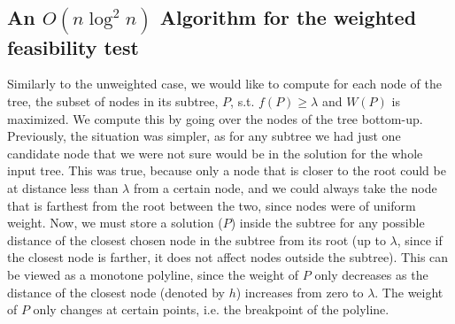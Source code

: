 \documentclass[11pt,a4paper]{article}
\theoremstyle{definition}
\theoremstyle{remark}
\begin{document}
\subsection{An \boldmath$O(n \log ^2 n)$ Algorithm for the weighted feasibility test}
Similarly to the unweighted case, we would like to compute for each node of the tree, the subset of nodes in its subtree, $P$, s.t. $f(P) \geq \lambda$ and $W(P)$ is maximized. We compute this by going over the nodes of the tree bottom-up. Previously, the situation was simpler, as for any subtree we had just one candidate node that we were not sure would be in the solution for the whole input tree. This was true, because only a node that is closer to the root could be at distance less than $\lambda$ from a certain node, and we could always take the node that is farthest from the root between the two, since nodes were of uniform weight.
Now, we must store a solution ($P$) inside the subtree for any possible distance of the closest chosen node in the subtree from its root (up to $\lambda$, since if the closest node is farther, it does not affect nodes outside the subtree). This can be viewed as a monotone polyline, since the weight of $P$ only decreases as the distance of the closest node (denoted by $h$) increases from zero to $\lambda$. The weight of $P$ only changes at certain points, i.e. the breakpoint of the polyline.
\end{document}
